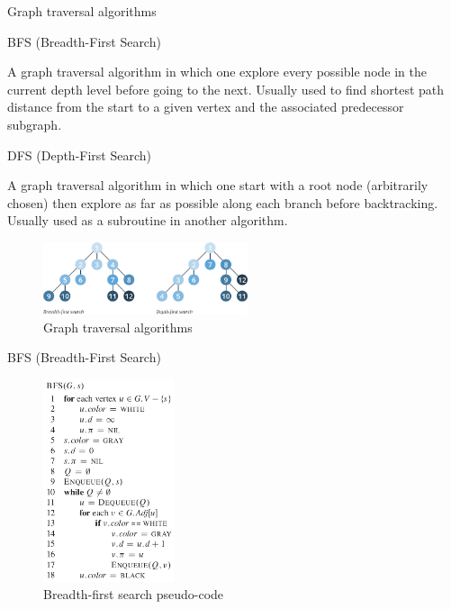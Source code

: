 \documentclass[ignorenonframetext,]{beamer}
\begin{document}
\begin{frame}{Graph traversal algorithms}
\protect\hypertarget{graph-traversal-algorithms}{}

\begin{block}{BFS (Breadth-First Search)}

A graph traversal algorithm in which one explore every possible node in
the current depth level before going to the next. Usually used to find
shortest path distance from the start to a given vertex and the
associated predecessor subgraph.

\end{block}

\begin{block}{DFS (Depth-First Search)}

A graph traversal algorithm in which one start with a root node
(arbitrarily chosen) then explore as far as possible along each branch
before backtracking. Usually used as a subroutine in another algorithm.

\begin{figure}
\centering
\includegraphics[width=\textwidth,height=0.83333in]{graph-traversal-algorithms-1.png}
\caption{Graph traversal algorithms}
\end{figure}

\end{block}

\end{frame}

\begin{frame}{BFS (Breadth-First Search)}
\protect\hypertarget{bfs-breadth-first-search-1}{}

\begin{figure}
\centering
\includegraphics[width=\textwidth,height=2.34375in]{breadth-first-search-pseudocode.png}
\caption{Breadth-first search pseudo-code}
\end{figure}

\end{frame}
\end{document}
